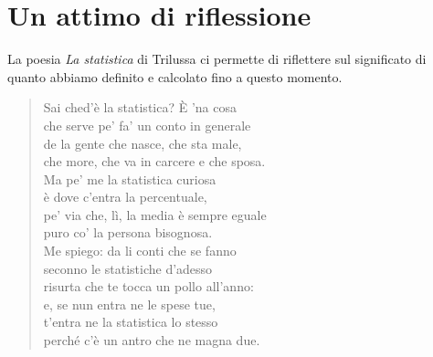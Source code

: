 \section{Un attimo di riflessione}

La poesia \emph{La statistica}
 di Trilussa ci permette di riflettere sul significato di quanto abbiamo definito e calcolato fino a questo momento.
	\begin{verse}
	Sai ched'è la statistica? È 'na cosa\\
	che serve pe' fa' un conto in generale\\
	de la gente che nasce, che sta male,\\
	che more, che va in carcere e che sposa.\\
	
	Ma pe' me la statistica curiosa\\
	è dove c'entra la percentuale,\\
	pe' via che, lì, la media è sempre eguale\\
	puro co' la persona bisognosa.\\
	
	Me spiego: da li conti che se fanno\\
	seconno le statistiche d'adesso\\
	risurta che te tocca un pollo all'anno:\\
	
	e, se nun entra ne le spese tue,\\
	t'entra ne la statistica lo stesso\\
	perché c'è un antro che ne magna due.\\
\end{verse}~\cite{2004tutte}

